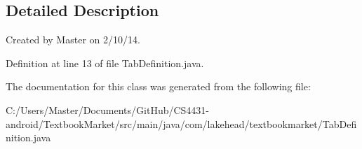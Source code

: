 \subsection{Detailed Description}
Created by Master on 2/10/14. 

Definition at line 13 of file Tab\-Definition.\-java.



The documentation for this class was generated from the following file\-:\begin{DoxyCompactItemize}
\item 
C\-:/\-Users/\-Master/\-Documents/\-Git\-Hub/\-C\-S4431-\/android/\-Textbook\-Market/src/main/java/com/lakehead/textbookmarket/Tab\-Definition.\-java\end{DoxyCompactItemize}
